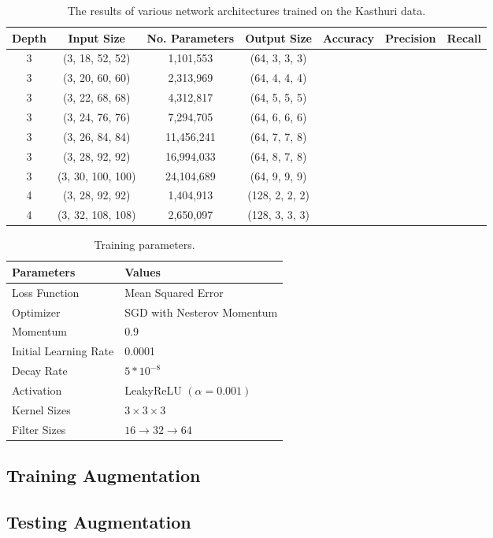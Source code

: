 \begin{table}
	\scriptsize
	\centering
	\begin{tabular}{c c c c c c c}
		\hline
		\textbf{Depth} & \textbf{Input Size} & \textbf{No. Parameters} & \textbf{Output Size} & \textbf{Accuracy} & \textbf{Precision} & \textbf{Recall} \\ \hline
		      3        & (3, 18, 52, 52)     & 1,101,553               & (64, 3, 3, 3)        &                   &                    &  \\
		      3        & (3, 20, 60, 60)     & 2,313,969               & (64, 4, 4, 4)        &                   &                    &  \\
		      3        & (3, 22, 68, 68)     & 4,312,817               & (64, 5, 5, 5)        &                   &                    &  \\
		      3        & (3, 24, 76, 76)     & 7,294,705               & (64, 6, 6, 6)        &                   &                    &  \\
		      3        & (3, 26, 84, 84)     & 11,456,241              & (64, 7, 7, 8)        &                   &                    &  \\
		      3        & (3, 28, 92, 92)     & 16,994,033              & (64, 8, 7, 8)        &                   &                    &  \\
		      3        & (3, 30, 100, 100)   & 24,104,689              & (64, 9, 9, 9)        &                   &                    &  \\
		      4        & (3, 28, 92, 92)     & 1,404,913               & (128, 2, 2, 2)       &                   &                    &  \\
		      4        & (3, 32, 108, 108)   & 2,650,097               & (128, 3, 3, 3)       &                   &                    &  \\ \hline
	\end{tabular}
	\caption{The results of various network architectures trained on the Kasthuri data.}
	\label{table:input-size}
\end{table}


\begin{table}[h!]
	\centering
	\begin{tabular}{l l} \hline
		\textbf{Parameters} & \textbf{Values} \\ \hline
		Loss Function & Mean Squared Error \\
		Optimizer & SGD  with Nesterov Momentum \\
		Momentum & 0.9 \\
		Initial Learning Rate & 0.0001 \\
		Decay Rate & $5 * 10^{-8}$ \\
		Activation & LeakyReLU $(\alpha = 0.001)$ \\
		Kernel Sizes & $3 \times 3 \times 3$ \\
		Filter Sizes & $16 \to 32 \to 64$ \\ \hline
	\end{tabular}
	\caption{Training parameters.}
	\label{table:architecture}
\end{table}

\subsection{Training Augmentation}

\subsection{Testing Augmentation}